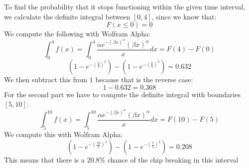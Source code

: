To find the probability that it stops functioning within the given time interval, we calculate the definite integral between $[0,4]$, since we know that:
$$
F(x \leq 0) = 0
$$
We compute the following with Wolfram Alpha:
$$
\int_0^{4}f(x) = \int_0^{4} \frac{\alpha e^{-(\beta x)^\alpha} (\beta x)^\alpha}{x}dx = F(4) - F(0)
$$
$$
(1 - e^{-(\frac{4}{4})^{2}}) - (1 - e^{-(\frac{0}{4})^{2}}) = 0.632
$$
We then subtract this from $1$ because that is the reverse case:
$$
1- 0.632 = 0.368
$$
For the second part we have to compute the definite integral with boundaries $[5,10]$:
$$
\int_5^{10} f(x) = \int_5^{10}\frac{\alpha e^{-(\beta x)^\alpha} (\beta x)^\alpha}{x}dx = F(10) - F(5)
$$
We compute this with Wolfram Alpha:
$$
(1 - e^{-(\frac{10}{4})^{2}}) - (1 - e^{-(\frac{5}{4})^{2}}) = 0.208
$$
This means that there is a 20.8\% chance of the chip breaking in this interval